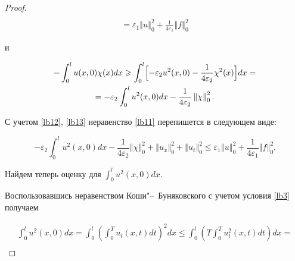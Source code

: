 \begin{proof}
\begin{multline}
\\

\label{lb12}

=\varepsilon_1 \left\Vert u \right\Vert_{0}^{2}+\frac{1}{4\varepsilon_1} \left\Vert f \right\Vert_{0}^{2}

\end{multline}

и

\begin{multline}

-\int _{0}^{l} u(x, 0) \chi(x)dx \geqslant 

\int _{0}^{l} \Bigl[-\varepsilon_2 u^2 (x, 0)-\frac{1}{4\varepsilon_2} \chi^2 (x)\Bigr] dx=

\\

\label{lb13}

=-\varepsilon_2 \int _{0}^{l} u^2 (x, 0)dx-\frac{1}{4\varepsilon_2} \left\Vert \chi \right\Vert_{0}^{2}.

\end{multline}

С учетом \eqref{lb12},  \eqref{lb13} неравенство \eqref{lb11} перепишется в следующем виде:

\begin{equation}

\label{lb14}

-\varepsilon_2 \int _{0}^{l} u^2 (x, 0)dx-\frac{1}{4\varepsilon_2} 

\left\Vert \chi \right\Vert_{0}^{2}+\left\Vert u_{x} \right\Vert_{0}^{2}+\left\Vert u_{t} \right\Vert_{0}^{2} \leqslant

\varepsilon_1 \left\Vert u \right\Vert_{0}^{2}+\frac{1}{4\varepsilon_1} \left\Vert f \right\Vert_{0}^{2}.

\end{equation}



Найдем теперь оценку для $\displaystyle \int _{0}^{l} u^2 (x, 0)dx$.

Воспользовавшись неравенством Коши"--~Буняковского с учетом  условия \eqref{lb3} получаем  

\begin{multline}

\int _{0}^{l} u^2 (x, 0)dx=\int _{0}^{l}\left(\int _{0}^{T} 

u_{t}(x, t)dt\right)^2 dx \leqslant \int _{0}^{l}\left(T \int _{0}^{T}u_{t}^{2}(x, t)dt\right)dx=

\\


\end{multline}
\end{proof}
